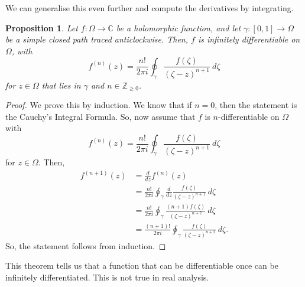 \documentclass[a4paper, openany]{memoir}
\theoremstyle{definition}
\theoremstyle{plain}
\newtheorem{proposition}[definition]{Proposition}
\begin{document}
We can generalise this even further and compute the derivatives by integrating.
\begin{proposition}
Let $f: \Omega \to \mathbb{C}$ be a holomorphic function, and let $\gamma: [0, 1] \to \Omega$ be a simple closed path traced anticlockwise. Then, $f$ is infinitely differentiable on $\Omega$, with
\[f^{(n)}(z) = \frac{n!}{2\pi i} \oint_\gamma \frac{f(\zeta)}{(\zeta - z)^{n+1}} \ d\zeta\]
for $z \in \Omega$ that lies in $\gamma$ and $n \in \mathbb{Z}_{\geq 0}$.
\end{proposition}
\begin{proof}
We prove this by induction. We know that if $n = 0$, then the statement is the Cauchy's Integral Formula. So, now assume that $f$ is $n$-differentiable on $\Omega$ with
\[f^{(n)}(z) = \frac{n!}{2\pi i} \oint_\gamma \frac{f(\zeta)}{(\zeta - z)^{n+1}} \ d\zeta\]
for $z \in \Omega$. Then,
\begin{align*}
    f^{(n+1)}(z) &= \frac{d}{dz} f^{(n)}(z) \\
    &= \frac{n!}{2\pi i} \oint_\gamma \frac{d}{dz} \frac{f(\zeta)}{(\zeta - z)^{n+1}} \ d\zeta \\
    &= \frac{n!}{2\pi i} \oint_\gamma \frac{(n+1) f(\zeta)}{(\zeta - z)^{n+2}} \ d\zeta \\
    &= \frac{(n+1)!}{2\pi i} \oint_\gamma \frac{f(\zeta)}{(\zeta - z)^{n+2}} \ d\zeta.
\end{align*}
So, the statement follows from induction.
\end{proof}
\noindent This theorem tells us that a function that can be differentiable once can be infinitely differentiated. This is not true in real analysis.
\end{document}
